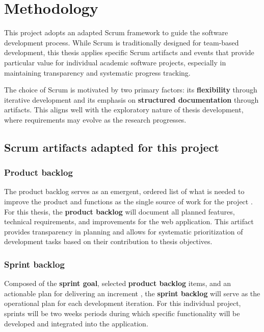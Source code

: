\section{Methodology}

This project adopts an adapted Scrum framework to guide the software development process. While Scrum is traditionally designed for team-based development, this thesis applies specific Scrum artifacts and events that provide particular value for individual academic software projects, especially in maintaining transparency and systematic progress tracking.

The choice of Scrum is motivated by two primary factors: its \textbf{flexibility} through iterative development and its emphasis on \textbf{structured documentation} through artifacts. This aligns well with the exploratory nature of thesis development, where requirements may evolve as the research progresses.

\subsection{Scrum artifacts adapted for this project}

\subsubsection{Product backlog}

The product backlog serves as an emergent, ordered list of what is needed to improve the product and functions as the single source of work for the project \parencite{schwaber2020scrum}. For this thesis, the \textbf{product backlog} will document all planned features, technical requirements, and improvements for the web application. This artifact provides transparency in planning and allows for systematic prioritization of development tasks based on their contribution to thesis objectives.

\subsubsection{Sprint backlog}

Composed of the \textbf{sprint goal}, selected \textbf{product backlog} items, and an actionable plan for delivering an increment \parencite{schwaber2020scrum}, the \textbf{sprint backlog}  will serve as the operational plan for each development iteration. For this individual project, sprints will be two weeks periods during which specific functionality will be developed and integrated into the application.

